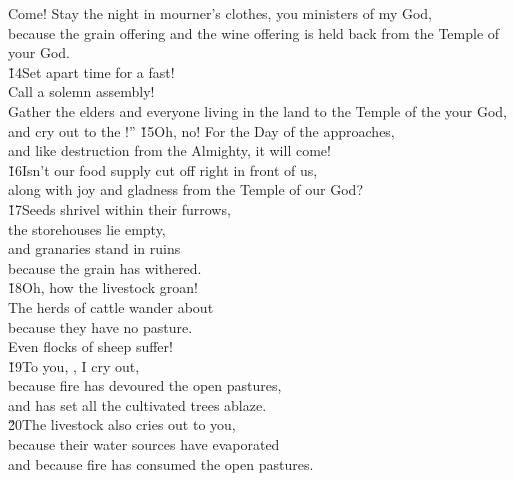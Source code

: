 \begin{poetry}
\poeml Come! Stay the night in mourner's clothes, you ministers of my God, \\
\poemll    because the grain offering and the wine offering is held back from the Temple of your God. \\
\poeml \v{14}Set apart time for a fast! \\
\poemll    Call a solemn assembly! \\
\poeml Gather the elders and everyone living in the land to the Temple of the  your God, \\
\poemll    and cry out to the !''
\poeml \v{15}Oh, no! For the Day of the  approaches, \\
\poemll    and like destruction from the Almighty, it will come! \\
\poeml \v{16}Isn't our food supply cut off right in front of us, \\
\poemll    along with joy and gladness from the Temple of our God? \\
\poeml \v{17}Seeds shrivel within their furrows, \\
\poemll    the storehouses lie empty, \\
\poeml and granaries stand in ruins \\
\poemll    because the grain has withered. \\
\poeml \v{18}Oh, how the livestock groan! \\
\poemll    The herds of cattle wander about \\
\poemlll       because they have no pasture. \\
\poeml Even flocks of sheep suffer! \\
\poeml \v{19}To you, , I cry out, \\
\poemll    because fire has devoured the open pastures, \\
\poemlll       and has set all the cultivated trees ablaze. \\
\poeml \v{20}The livestock also cries out to you, \\
\poemll    because their water sources have evaporated \\
\poemlll       and because fire has consumed the open pastures.
\end{poetry}

